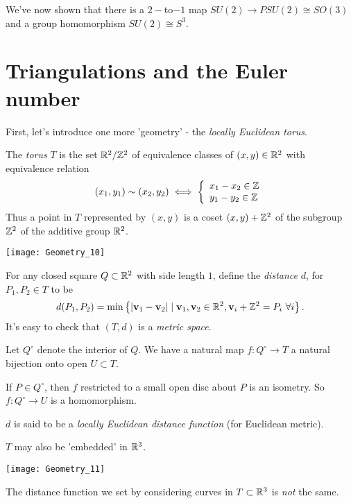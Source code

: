 \documentclass[a4paper]{article}
\begin{document}
We've now shown that there is a $2-$to$-1$ map $SU(2) \to PSU(2) \cong SO(3)$ and a group homomorphism $SU(2) \cong S^3$.

\newpage

\section{Triangulations and the Euler number}
First, let's introduce one more 'geometry' - the \emph{locally Euclidean torus}.

\begin{defi}
The \emph{torus} $T$ is the set $\mathbb{R}^2/\mathbb{Z}^2$ of equivalence classes of $(x,y) \in \mathbb{R}^2$ with equivalence relation
\begin{equation*}
\begin{aligned}
(x_1,y_1) \sim (x_2,y_2) \iff \left\{\begin{array}{ll}
x_1-x_2 \in \mathbb{Z}\\
y_1-y_2 \in \mathbb{Z}
\end{array}\right.
\end{aligned}
\end{equation*}
Thus a point in $T$ represented by $(x,y)$ is a coset $(x,y)+\mathbb{Z}^2$ of the subgroup $\mathbb{Z}^2$ of the additive group $\mathbb{R}^2$.
\end{defi}

\texttt{[image: Geometry\_10]}

For any closed square $Q \subset \mathbb{R}^2$ with side length $1$, define the \emph{distance} $d$, for $P_1,P_2 \in T$ to be
\begin{equation*}
\begin{aligned}
d(P_1,P_2) = \min \left\{|\mathbf{v}_1-\mathbf{v}_2| \mid \mathbf{v}_1,\mathbf{v}_2 \in \mathbb{R}^2, \mathbf{v}_i+\mathbb{Z}^2 = P_i \ \forall i\right\}.
\end{aligned}
\end{equation*}
It's easy to check that $(T,d)$ is a \emph{metric space}.

Let $Q^\circ$ denote the interior of $Q$. We have a natural map $f:Q^\circ \to T$ a natural bijection onto open $U \subset T$.

If $P \in Q^\circ$, then $f$ restricted to a small open disc about $P$ is an isometry. So $f:Q^\circ \to U$ is a homomorphism.

$d$ is said to be a \emph{locally Euclidean distance function} (for Euclidean metric).

\begin{rem}
$T$ may also be 'embedded' in $\mathbb{R}^3$.

\texttt{[image: Geometry\_11]}

The distance function we set by considering curves in $T \subset \mathbb{R}^3$ is \emph{not} the same.
\end{rem}
\end{document}
